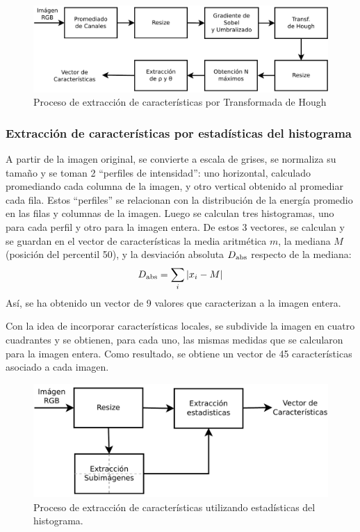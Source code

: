 \documentclass[conference,a4paper,10pt,oneside,final]{tfmpd}
\begin{document}
\begin{figure}
\begin{center}
\includegraphics[scale=0.25]{../diagramas/procesohough} 
\end{center}
\caption{Proceso de extracción de características por Transformada de Hough}
\label{procesohough}
\end{figure}
%
%
\subsubsection{Extracción de características por estadísticas del histograma}
A partir de la imagen original, se convierte a escala de grises, se normaliza
su tamaño y se toman 2
``perfiles de intensidad'': uno horizontal, calculado promediando
cada columna de la imagen, y otro vertical obtenido al promediar cada fila.
Estos ``perfiles'' se relacionan con la distribución de la energía promedio
en las filas y columnas de la imagen.
Luego se calculan tres histogramas, uno para cada perfil y otro para la
imagen entera. De estos 3 vectores, se calculan y se guardan en el
vector de características la media aritmética $m$, la mediana $M$ (posición del
percentil 50),  y la desviación absoluta $D_{\textrm{abs}}$ respecto de la mediana:
\begin{equation}
D_{\textrm{abs}}=\sum_i |x_i - M|
\end{equation}
Así, se ha obtenido un vector de 9 valores que caracterizan %
a la imagen entera.

Con la idea de incorporar características locales,
se sub\-di\-vi\-de la imagen en cuatro
cuadrantes y se obtienen, para cada uno, las mismas medidas que se calcularon
para  la imagen entera. Como resultado, se obtiene un vector de 45
características asociado a cada imagen.

\begin{figure}
\begin{center}
\includegraphics[scale=0.25]{../diagramas/procesoestadisticas}
\end{center}
\caption{Proceso de extracción de características utilizando estadísticas del
histograma.}
\label{procesoestadisticas}
\end{figure}
\end{document}
